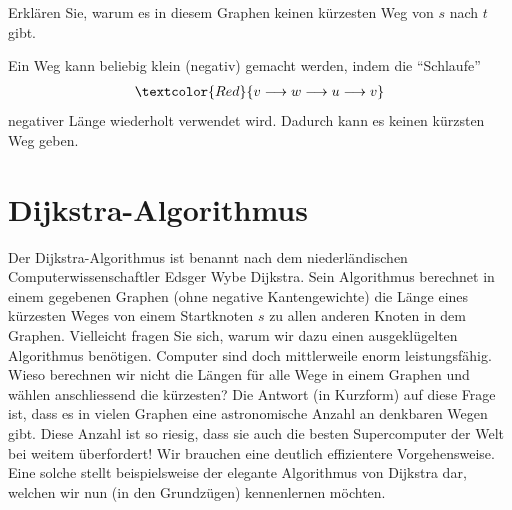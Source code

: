 \begin{myexercise}\label{aufgabe:204}
\begin{figure}[H]
\centering
{}
\end{figure}
Erklären Sie, warum es in diesem Graphen keinen kürzesten Weg von $s$ nach $t$ gibt.
\begin{myanswer}\label{aufgabe:204-sol}
Ein Weg kann beliebig klein (negativ) gemacht werden, indem die \enquote{Schlaufe}
\begin{align*}
    \textcolor{Red}{ v \longrightarrow w \longrightarrow u \longrightarrow v}
\end{align*}
negativer Länge wiederholt verwendet wird. Dadurch kann es keinen kürzsten Weg geben.
\end{myanswer}
\end{myexercise}


\section{Dijkstra-Algorithmus}
Der Dijkstra-Algorithmus ist benannt nach dem niederländischen Computerwissenschaftler Edsger Wybe Dijkstra. Sein Algorithmus berechnet in einem gegebenen Graphen (ohne negative Kantengewichte) die Länge eines kürzesten Weges von einem Startknoten $s$ zu allen anderen Knoten in dem Graphen. Vielleicht fragen Sie sich, warum wir dazu einen ausgeklügelten Algorithmus benötigen. Computer sind doch mittlerweile enorm leistungsfähig. Wieso berechnen wir nicht die Längen für alle Wege in einem Graphen und wählen anschliessend die kürzesten? Die Antwort (in Kurzform) auf diese Frage ist, dass es in vielen Graphen eine astronomische Anzahl an denkbaren Wegen gibt. Diese Anzahl ist so riesig, dass sie auch die besten Supercomputer der Welt bei weitem überfordert! Wir brauchen eine deutlich effizientere Vorgehensweise. Eine solche stellt beispielsweise der elegante Algorithmus von Dijkstra dar, welchen wir nun (in den Grundzügen) kennenlernen möchten.

